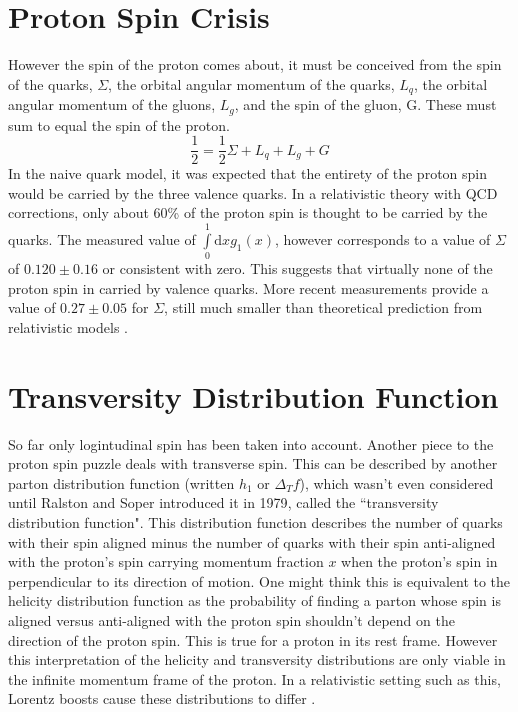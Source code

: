 \documentclass[abstract = on,listof=totoc, bibliography=totoc]{scrreprt}
\begin{document}
\section{Proton Spin Crisis}
However the spin of the proton comes about, it must be conceived from the spin of the quarks, $\Sigma$, the orbital angular momentum of the quarks, $L_q$, the orbital angular momentum of the gluons, $L_g$, and the spin of the gluon, G. These must sum to equal the spin of the proton.
\begin{equation}
\frac{1}{2} = \frac{1}{2}\Sigma + L_q + L_g + G
\end{equation}
In the naive quark model, it was expected that the entirety of the proton spin would be carried by the three valence quarks. In a relativistic theory with QCD corrections, only about 60\% of the proton spin is thought to be carried by the quarks. The measured value of $\int\limits_0^1 \text{d}x g_1(x)$, however corresponds to a value of $\Sigma$ of $0.120 \pm 0.16$ or consistent with zero. This suggests that virtually none of the proton spin in carried by valence quarks. More recent measurements provide a value of $0.27\pm 0.05$ for $\Sigma$, still much smaller than theoretical prediction from relativistic models \cite{jaffeWhereSpinComeFrom}. 

\section{Transversity Distribution Function}
So far only logintudinal spin has been taken into account. Another piece to the proton spin puzzle deals with transverse spin. This can be described by another parton distribution function (written $h_1$ or $\Delta_T f$), which wasn't even considered until Ralston and Soper introduced it in 1979\cite{transIntroduced}, called the ``transversity distribution function". This distribution function describes the number of quarks with their spin aligned minus the number of quarks with their spin anti-aligned with the proton's spin carrying momentum fraction $x$ when the proton's spin in perpendicular to its direction of motion. One might think this is equivalent to the helicity distribution function as the probability of finding a parton whose spin is aligned versus anti-aligned with the proton spin shouldn't depend on the direction of the proton spin. This is true for a proton in its rest frame. However this interpretation of the helicity and transversity distributions are only viable in the infinite momentum frame of the proton. In a relativistic setting such as this, Lorentz boosts cause these distributions to differ \cite{BacchettaThesis}.   
\end{document}
